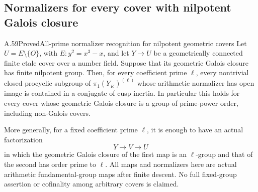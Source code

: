 \subsection{Normalizers for every cover with nilpotent Galois closure}

\begin{statement}{A.59}{Proved}{All-prime normalizer recognition for nilpotent geometric covers}
Let \(U=E\setminus\{O\}\), with \(E:y^2=x^3-x\), and let
\(Y\to U\) be a geometrically connected finite etale cover over
a number field. Suppose that its geometric Galois closure has
finite nilpotent group. Then, for every coefficient prime
\(\ell\), every nontrivial closed procyclic subgroup of
\(\pi_1(Y_{\overline K})^{(\ell)}\) whose arithmetic normalizer
has open image is contained in a conjugate of cusp inertia.
In particular this holds for every cover whose geometric Galois
closure is a group of prime-power order, including non-Galois covers.

More generally, for a fixed coefficient prime \(\ell\), it is
enough to have an actual factorization
\[
                           Y\longrightarrow V\longrightarrow U
                                                        \tag{A.59.1}
\]
in which the geometric Galois closure of the first map is an
\(\ell\)-group and that of the second has order prime to
\(\ell\). All maps and normalizers here are actual arithmetic
fundamental-group maps after finite descent. No full fixed-group
assertion or cofinality among arbitrary covers is claimed.
\end{statement}

